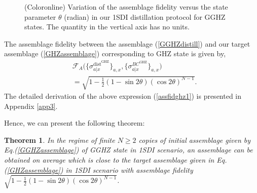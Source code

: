 \documentclass[reprint,superscriptaddress,nofootinbib,amsmath,amssymb,aps,pra,longbibliography]{revtex4-1}
\newtheorem{thm}{Theorem}
\begin{document}
\begin{figure}[t!]
\caption{\footnotesize (Coloronline)  Variation of the assemblage fidelity versus the state parameter $\theta$ (radian) in our 1SDI distillation protocol for GGHZ states. The quantity in the vertical axis has no units.}  
\label{fig1}
\end{figure}

 The assemblage fidelity between the assemblage (\ref{GGHZdistill}) and our target assemblage (\ref{GHZassemblage}) corresponding to GHZ state  is given by, 
\begin{align}
    &\mathcal{F}_{A} \Big( \{\sigma_{a|x}^{\text{dist}^{\text{GHZ}}} \}_{a,x}, \{\sigma_{a|x}^{BC^{\text{GHZ}}}\}_{a,x} \Big) \nonumber \\
     &=\sqrt{1 - \frac{1}{2} (1 - \sin 2 \theta ) (\cos 2 \theta )^{N-1}}.
     \label{assfidghz1}
\end{align}
The detailed derivation of the above expression (\ref{assfidghz1}) is presented in Appendix \ref{app3}.


Hence, we can present the following theorem:
\begin{thm}
In the regime of finite $N \geq 2$ copies of initial assemblage given by Eq.(\ref{GGHZassemblage}) of GGHZ state in 1SDI scenario, an assemblage can be obtained on average which is close to the target assemblage given in Eq.(\ref{GHZassemblage}) in 1SDI scenario with assemblage fidelity $\sqrt{1 - \frac{1}{2} (1 - \sin 2 \theta ) (\cos 2 \theta )^{N-1}}$.
\end{thm}
\end{document}
